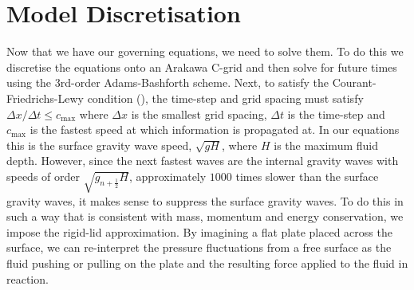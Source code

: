 \documentclass[12pt,a4paper]{report}
\newcommand*{\half}{\frac{1}{2}}
\begin{document}
\section{Model Discretisation}

Now that we have our governing equations, we need to solve them. To do this we
discretise the equations onto an Arakawa C-grid and then solve for future times
using the 3rd-order Adams-Bashforth scheme. Next, to satisfy the Courant-Friedrichs-Lewy
 condition (\cite{courant1928partiellen}), the time-step and grid spacing must satisfy ${\Delta x}/{\Delta t} \leq c_{\max}$ where $\Delta x$ is the smallest grid spacing, $\Delta t$ is
 the time-step and $c_{\max}$ is the fastest speed at which information is propagated at. 
 In our equations this is the surface gravity wave speed, $\sqrt{g H}$, where $H$ is the
 maximum fluid depth. However, since the next fastest waves are the internal gravity
  waves with speeds of order $\sqrt{g_{n+\half} H}$, approximately $1000$ times slower than the surface gravity waves, it makes sense to suppress the surface gravity
  waves. To do this in such a way that is consistent with mass, momentum and energy 
  conservation, we impose the rigid-lid approximation. By imagining a flat plate 
  placed across the surface, we can re-interpret the pressure fluctuations from a free
  surface as the fluid pushing or pulling on the plate and the resulting force 
  applied to the fluid in reaction. 
  
\end{document}
